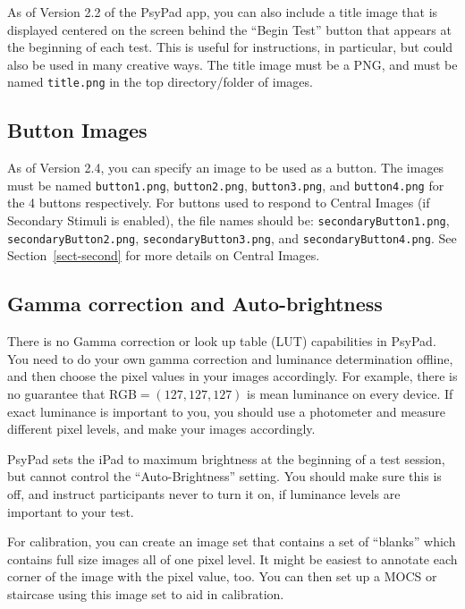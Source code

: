 \documentclass{article}
\begin{document}
As of Version 2.2 of the PsyPad app, you can also include a title
image that is displayed centered on the screen behind the ``Begin Test'' button that
appears at the beginning of each test.
This is useful for instructions, in particular, but could also
be used in many creative ways.  The title image must be a PNG,
and must be named {\tt title.png} in the top directory/folder
of images.  



\subsection{Button  Images}
\label{sect-butti}

As of Version 2.4, you can specify an image to be used as a button. The images must be named 
              {\tt button1.png},
              {\tt button2.png},
              {\tt button3.png}, and
              {\tt button4.png} for the 4 buttons respectively.
For buttons used to respond to Central Images (if Secondary Stimuli is enabled), 
the file names should be:
{\tt secondaryButton1.png},
              {\tt secondaryButton2.png},
              {\tt secondaryButton3.png}, and
              {\tt secondaryButton4.png}.
See Section~\ref{sect-second} for more details on Central Images.


\subsection{Gamma correction and Auto-brightness}

There is no Gamma correction or look up table (LUT) capabilities in PsyPad.
You need to do your own gamma correction and luminance determination offline, and then
choose the pixel values in your images accordingly.
For example, there is no guarantee that RGB$=(127,127,127)$ 
is mean luminance on every device. If
exact luminance is important to you, you should use a photometer and measure different
pixel levels, and make your images accordingly.

PsyPad sets the iPad to maximum brightness at the beginning of a
test session, but cannot control the ``Auto-Brightness'' setting.
You should make sure this is off, and instruct participants never
to turn it on, if luminance levels are important to your test.

For calibration, you can create an image set that contains 
a set of ``blanks'' which contains full size images 
all of one pixel level. It might be easiest to annotate each corner of the
image with the pixel value, too.
You can then set up a MOCS or staircase using this image set 
to aid in calibration.
\end{document}
